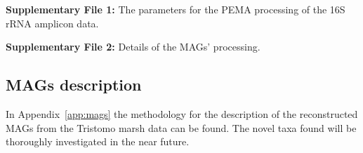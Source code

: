    \textbf{Supplementary File 1:} The parameters for the PEMA processing of the 16S rRNA amplicon data.
    
   \textbf{Supplementary File 2:} Details of the MAGs’ processing. 
   


\subsection*{MAGs description}

   In Appendix~\ref{app:mags} the methodology for the description of the reconstructed MAGs 
   from the Tristomo marsh data can be found. 
   The novel taxa found will be thoroughly investigated in the near future. 


